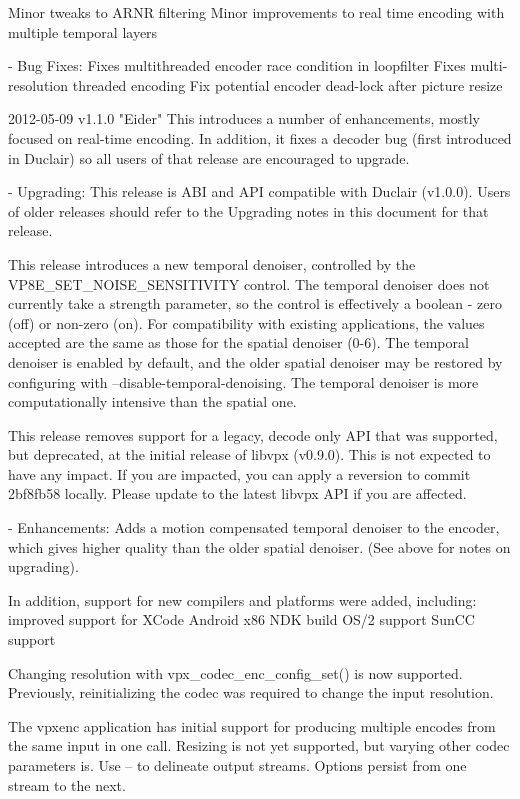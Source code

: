 \begin{DoxyVerbInclude}
      Minor tweaks to ARNR filtering
      Minor improvements to real time encoding with multiple temporal layers

  - Bug Fixes:
      Fixes multithreaded encoder race condition in loopfilter
      Fixes multi-resolution threaded encoding
      Fix potential encoder dead-lock after picture resize


2012-05-09 v1.1.0 "Eider"
  This introduces a number of enhancements, mostly focused on real-time
  encoding. In addition, it fixes a decoder bug (first introduced in
  Duclair) so all users of that release are encouraged to upgrade.

  - Upgrading:
    This release is ABI and API compatible with Duclair (v1.0.0). Users
    of older releases should refer to the Upgrading notes in this
    document for that release.

    This release introduces a new temporal denoiser, controlled by the
    VP8E_SET_NOISE_SENSITIVITY control. The temporal denoiser does not
    currently take a strength parameter, so the control is effectively
    a boolean - zero (off) or non-zero (on). For compatibility with
    existing applications, the values accepted are the same as those
    for the spatial denoiser (0-6). The temporal denoiser is enabled
    by default, and the older spatial denoiser may be restored by
    configuring with --disable-temporal-denoising. The temporal denoiser
    is more computationally intensive than the spatial one.

    This release removes support for a legacy, decode only API that was
    supported, but deprecated, at the initial release of libvpx
    (v0.9.0). This is not expected to have any impact. If you are
    impacted, you can apply a reversion to commit 2bf8fb58 locally.
    Please update to the latest libvpx API if you are affected.

  - Enhancements:
      Adds a motion compensated temporal denoiser to the encoder, which
      gives higher quality than the older spatial denoiser. (See above
      for notes on upgrading).

      In addition, support for new compilers and platforms were added,
      including:
        improved support for XCode
        Android x86 NDK build
        OS/2 support
        SunCC support

      Changing resolution with vpx_codec_enc_config_set() is now
      supported. Previously, reinitializing the codec was required to
      change the input resolution.

      The vpxenc application has initial support for producing multiple
      encodes from the same input in one call. Resizing is not yet
      supported, but varying other codec parameters is. Use -- to
      delineate output streams. Options persist from one stream to the
      next.


\end{DoxyVerbInclude}
